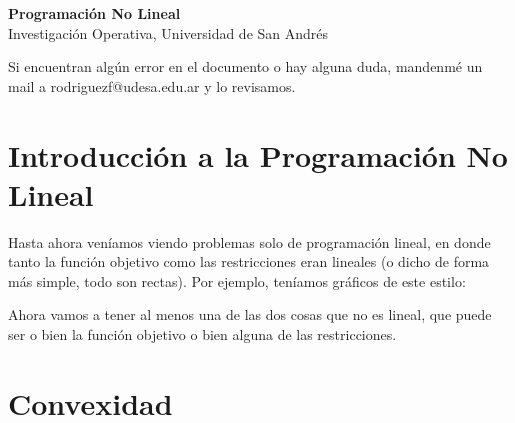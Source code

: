 \documentclass[12pt]{article}
\begin{document}
\begin{center}
  {\LARGE \textbf{Programación No Lineal}}\\[0.5em]
  {Investigación Operativa, Universidad de San Andrés}
\end{center}

Si encuentran algún error en el documento o hay alguna duda, mandenmé un mail a rodriguezf@udesa.edu.ar y lo revisamos.

\section{Introducción a la Programación No Lineal}

Hasta ahora veníamos viendo problemas solo de programación lineal, en donde tanto la función objetivo como las restricciones eran lineales (o dicho de forma más simple, todo son rectas). Por ejemplo, teníamos gráficos de este estilo:

\vspace{1em}

\begin{center}
\end{center}

Ahora vamos a tener al menos una de las dos cosas que no es lineal, que puede ser o bien la función objetivo o bien alguna de las restricciones.

\section{Convexidad}
\end{document}
